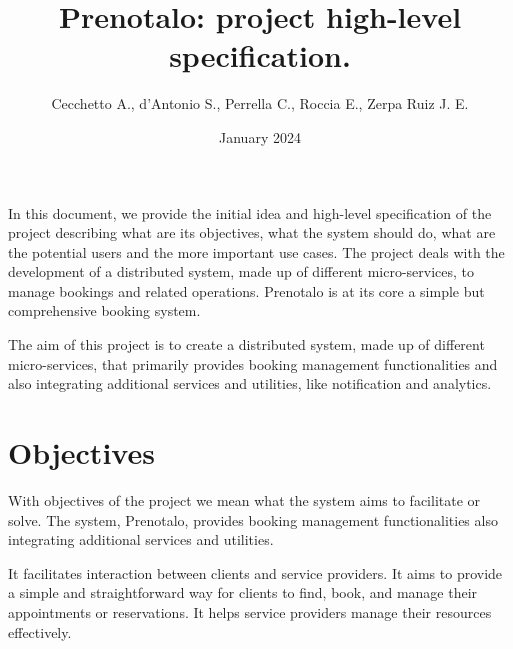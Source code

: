 \documentclass{article}
\title{Prenotalo: project high-level specification.}
\author{Cecchetto A., d'Antonio S., Perrella C., Roccia E., Zerpa Ruiz J. E.}
\date{January 2024}
\begin{document}
\maketitle

In this document, we provide the initial idea and high-level specification of the project describing what are its objectives, what the system should do, what are the potential users and the more important use cases. The project deals with the development of a distributed system, made up of different micro-services, to manage bookings and related operations. Prenotalo is at its core a simple but comprehensive booking system.

The aim of this project is to create a distributed system, made up of different
micro-services, that primarily provides booking management functionalities
and also integrating additional services and utilities, like notification and analytics.

\section{Objectives}
With objectives of the project we mean what the system aims to facilitate or solve. The system, Prenotalo, provides booking management functionalities also integrating additional services and utilities.

It facilitates interaction between clients and service providers. It aims to provide a simple and straightforward way for clients to find, book, and manage their appointments or reservations. It helps service providers manage their resources effectively.
\end{document}
